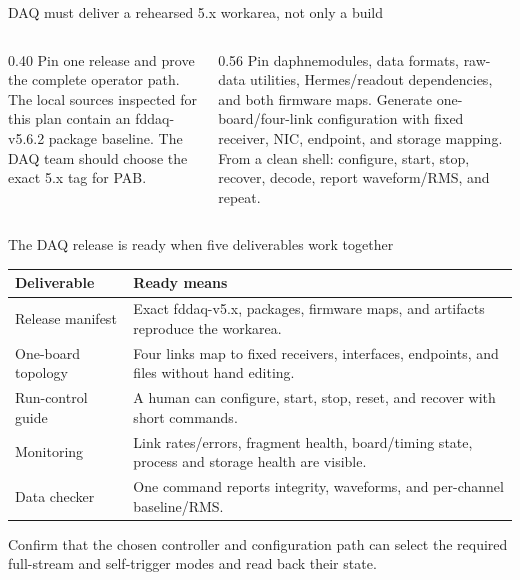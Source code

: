 \documentclass[aspectratio=169,11pt]{beamer}
\begin{document}
\begin{frame}{DAQ must deliver a rehearsed 5.x workarea, not only a build}
  \begin{columns}[T,onlytextwidth]
    \begin{column}{0.40\textwidth}
        {Pin one release and prove the complete operator path.}
        {The local sources inspected for this plan contain an fddaq-v5.6.2 package baseline. The DAQ team should choose the exact 5.x tag for PAB.}
    \end{column}
    \begin{column}{0.56\textwidth}
        {Pin daphnemodules, data formats, raw-data utilities, Hermes/readout dependencies, and both firmware maps.}
      \smallskip
        {Generate one-board/four-link configuration with fixed receiver, NIC, endpoint, and storage mapping.}
      \smallskip
        {From a clean shell: configure, start, stop, recover, decode, report waveform/RMS, and repeat.}
    \end{column}
  \end{columns}
\end{frame}

\begin{frame}{The DAQ release is ready when five deliverables work together}
  \footnotesize
  \renewcommand{\arraystretch}{1.04}
  \begin{tabularx}{\textwidth}{@{}p{} X@{}}
    \toprule
    Deliverable & Ready means \\
    \midrule
    Release manifest & Exact fddaq-v5.x, packages, firmware maps, and artifacts reproduce the workarea. \\
    One-board topology & Four links map to fixed receivers, interfaces, endpoints, and files without hand editing. \\
    Run-control guide & A human can configure, start, stop, reset, and recover with short commands. \\
    Monitoring & Link rates/errors, fragment health, board/timing state, process and storage health are visible. \\
    Data checker & One command reports integrity, waveforms, and per-channel baseline/RMS. \\
    \bottomrule
  \end{tabularx}

  \medskip
    {Confirm that the chosen controller and configuration path can select the required full-stream and self-trigger modes and read back their state.}
\end{frame}
\end{document}
